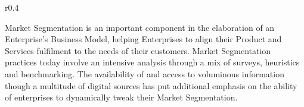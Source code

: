 %
%

\begin{wrapfigure}[12]{r}{0.4\textwidth}
    \vspace{-12pt}
    \begin{center}
        \begin{tcolorbox}[colback=secondary!5,colframe=secondary!60]
        \end{tcolorbox}
    \end{center}
\end{wrapfigure}

Market Segmentation is an important component in the elaboration of an Enterprise’s Business Model,
helping Enterprises to align their Product and Services fulfilment to the needs of their customers.
Market Segmentation practices today involve an intensive analysis through a mix of surveys,
heuristics and benchmarking.
The availability of and access to voluminous information though a multitude of digital sources has put
additional emphasis on the ability of enterprises to dynamically tweak their Market Segmentation.

\ekgmmContextSection



